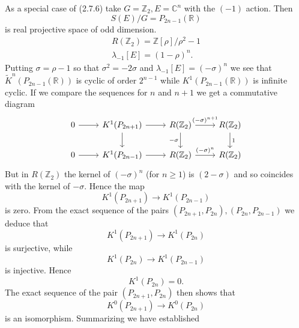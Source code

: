 \documentclass[leqno]{book}
\numberwithin{equation}{section}
\theoremstyle{definition}
\begin{document}
            As a special case of (2.7.6) take $G=\mathbb{Z}_{2}, E=\mathbb{C}^{n}$ with the $(-1)$ action. Then
            \begin{equation*}
              S(E)/G=P_{2n-1}(\mathbb{R})
            \end{equation*}
            is real projective space of odd dimension.
            \begin{equation*}
              \begin{aligned}
              R(\mathbb{Z}_{2})=\mathbb{Z}[\rho]/\rho^{2}-1 \\
              \lambda_{-1}[E] = (1-\rho)^{n}.
              \end{aligned}
            \end{equation*}
            Putting $\sigma=\rho-1$ so that $\sigma^{2}=-2\sigma$ and $\lambda_{-1}[E]=(-\sigma)^{n}$ we see that $\tilde{K}^{n}(P_{2n-1}(\mathbb{R}))$ is cyclic of order $2^{n-1}$ while $K^{1}(P_{2n-1}(\mathbb{R}))$ is infinite cyclic. If we compare the sequences for $n$ and $n+1$ we get a commutative diagram
            \begin{equation*}
              \begin{tikzcd}
                0\arrow[r] & K^{1}(P_{2n+1})\arrow[d] \arrow[r] & R(\mathbb{Z}_{2})\arrow[d, "-\sigma"'] \arrow[r, "(-\sigma)^{n+1}"] & R(\mathbb{Z}_{2})\arrow[d, "1"] \\
                0\arrow[r] & K^{1}(P_{2n-1})\arrow[r] & R(\mathbb{Z}_{2})\arrow[r, "(-\sigma)^{n}"] & R(\mathbb{Z}_{2})
              \end{tikzcd}
            \end{equation*}
            But in $R(\mathbb{Z}_{2})$ the kernel of $(-\sigma)^{n}$ (for $n\ge 1$) is $(2-\sigma)$ and so coincides with the kernel of $-\sigma$. Hence the map
            \begin{equation*}
              K^{1}(P_{2n+1})\to K^{1}(P_{2n-1})
            \end{equation*}
            is zero. From the exact sequence of the pairs $(P_{2n+1},P_{2n}),(P_{2n},P_{2n-1})$ we deduce that 
            \begin{equation*}
              K^{1}(P_{2n+1})\to K^{1}(P_{2n})
            \end{equation*}
            is surjective, while
            \begin{equation*}
              K^{1}(P_{2n})\to K^{1}(P_{2n-1})
            \end{equation*}
            is injective. Hence
            \begin{equation*}
              K^{1}(P_{2n})=0.
            \end{equation*}
            The exact sequence of the pair $(P_{2n+1},P_{2n})$ then shows that
            \begin{equation*}
              K^{0}(P_{2n+1})\to K^{0}(P_{2n})
            \end{equation*}
            is an isomorphism. Summarizing we have established
\end{document}
